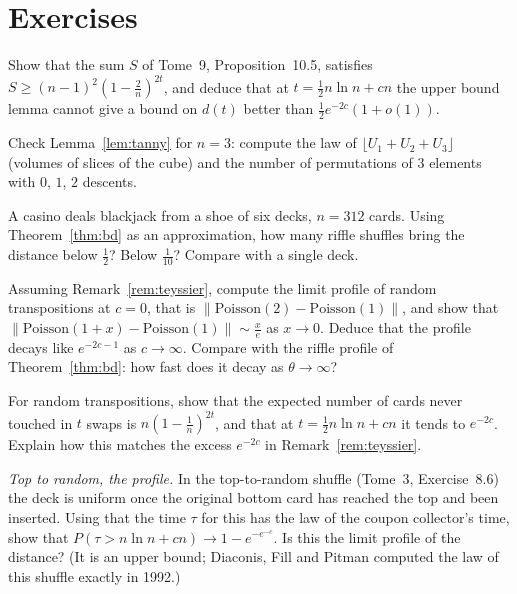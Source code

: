 \section{Exercises}

\begin{exercise}[$\star$]\label{ex:lemmalimit}
Show that the sum $S$ of Tome~9, Proposition~10.5, satisfies $S\ge(n-1)^2(1-\frac2n)^{2t}$, and deduce that at $t=\frac12n\ln n+cn$ the upper bound lemma cannot give a bound on $d(t)$
better than $\frac12e^{-2c}(1+o(1))$.
\end{exercise}

\begin{exercise}[$\star$]\label{ex:tannysmall}
Check Lemma~\ref{lem:tanny} for $n=3$: compute the law of $\lfloor U_1+U_2+U_3\rfloor$ (volumes of slices of the cube) and the number of permutations of $3$ elements with $0$, $1$, $2$ descents.
\end{exercise}

\begin{exercise}[$\star\star$]\label{ex:shoe}
A casino deals blackjack from a shoe of six decks, $n=312$ cards. Using Theorem~\ref{thm:bd} as an approximation, how many riffle shuffles bring the distance below
$\frac12$? Below $\frac1{10}$? Compare with a single deck.
\end{exercise}

\begin{exercise}[$\star\star$]\label{ex:profile}
Assuming Remark~\ref{rem:teyssier}, compute the limit profile of random transpositions at $c=0$, that is $\|\mathrm{Poisson}(2)-\mathrm{Poisson}(1)\|$, and show that
$\|\mathrm{Poisson}(1+x)-\mathrm{Poisson}(1)\|\sim\frac x{e}$ as $x\to0$. Deduce that the profile decays like $e^{-2c-1}$ as $c\to\infty$. Compare with the riffle profile of Theorem~\ref{thm:bd}: how fast does
it decay as $\theta\to\infty$?
\end{exercise}

\begin{exercise}[$\star\star$]\label{ex:untouched}
For random transpositions, show that the expected number of cards never touched in $t$ swaps is $n(1-\frac1n)^{2t}$, and that at $t=\frac12n\ln n+cn$ it tends to $e^{-2c}$. Explain how this
matches the excess $e^{-2c}$ in Remark~\ref{rem:teyssier}.
\end{exercise}

\begin{exercise}[$\star\star\star$]\label{ex:topinsert}
\emph{Top to random, the profile.} In the top-to-random shuffle (Tome~3, Exercise~8.6) the deck is uniform once the original bottom card has reached the top and been
inserted. Using that the time $\tau$ for this has the law of the coupon collector's time, show that $P(\tau>n\ln n+cn)\to1-e^{-e^{-c}}$. Is this the limit profile of the distance?
(It is an upper bound; Diaconis, Fill and Pitman computed the law of this shuffle exactly in 1992.)
\end{exercise}

